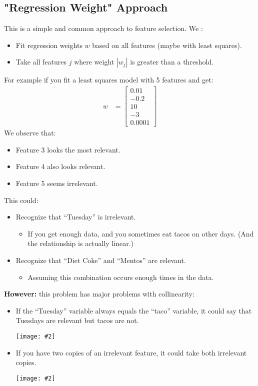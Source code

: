 \documentclass{article}
\def\blu#1{{\color{blu}#1}}
\def\red#1{{\color{red}#1}}
\newcommand{\centerfig}[2]{\begin{center}\texttt{[image: \#2]}\end{center}}
\begin{document}
\subsection*{"Regression Weight" Approach}
This is a simple and common approach to feature selection. We :
\begin{itemize}
	\item \blu{Fit regression weights $ w $ based on all features }(maybe with least squares).
	\item Take all features $ j $ where \blu{weight $ |w_j| $ is greater than a threshold.}
\end{itemize}
For example if you fit a least squares model with 5 features and get:
\begin{align*}
w &= \begin{bmatrix}
0.01 \\ -0.2 \\ 10 \\ -3 \\ 0.0001
\end{bmatrix}
\end{align*}
We observe that:
\begin{itemize}[label = -]
	\item Feature 3 looks the most relevant. 
	\item Feature 4 also looks relevant.
	\item Feature 5 seems irrelevant.
\end{itemize}
This could:
\begin{itemize}
	\item Recognize that “Tuesday” is irrelevant.
	\begin{itemize}
		\item If you get enough data, and you sometimes eat tacos on other days. (And the relationship is actually linear.)
	\end{itemize}
	\item Recognize that “Diet Coke” and “Mentos” are relevant. 
	\begin{itemize}
		\item Assuming this combination occurs enough times in the data.
	\end{itemize}
\end{itemize}
\textbf{However:} this problem has \red{major problems with collinearity}:
\begin{itemize}
	\item If the “Tuesday” variable always equals the “taco” variable, it \red{could say that Tuesdays are relevant but tacos are not.} 
	\centerfig{0.75}{reg-weight-1}
	\item If you have two copies of an irrelevant feature, \red{it could take both irrelevant copies}.
		\centerfig{0.9}{reg-weight-2}
\end{itemize}
\end{document}
